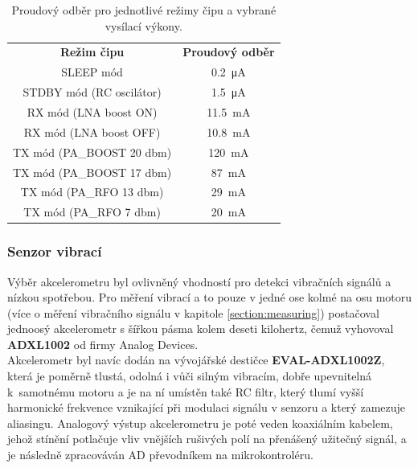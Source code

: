         \begin{table}[H]
        \begin{ctucolortab}
        \begin{tabular}{c!{\vrule width 2pt}c}
            \textbf{Režim čipu} &  \textbf{Proudový odběr}\\ 
            \Xhline{4\arrayrulewidth}
            SLEEP mód & \SI{0.2}{\micro\ampere} \\\hline
            STDBY mód (RC oscilátor)& \SI{1.5}{\micro\ampere} \\\hline
            RX mód (LNA boost ON) & \SI{11.5}{\milli\ampere} \\\hline
            RX mód (LNA boost OFF) & \SI{10.8}{\milli\ampere} \\\hline
            TX mód (PA\_BOOST 20 dbm) & \SI{120}{\milli\ampere} \\\hline
            TX mód (PA\_BOOST 17 dbm) & \SI{87}{\milli\ampere} \\\hline
            TX mód (PA\_RFO 13 dbm) & \SI{29}{\milli\ampere} \\\hline
            TX mód (PA\_RFO 7 dbm) & \SI{20}{\milli\ampere}
        \end{tabular}
        \end{ctucolortab}
        \caption{Proudový odběr pro jednotlivé režimy čipu a vybrané vysílací výkony.}
        \label{table:currents}
    \end{table}

    

\subsubsection{Senzor vibrací}
    Výběr akcelerometru byl ovlivněný vhodností pro detekci vibračních signálů a nízkou spotřebou. Pro měření vibrací a to pouze v jedné ose kolmé na osu motoru (více o měření vibračního signálu v kapitole \ref{section:measuring}) postačoval jednoosý akcelerometr s šířkou pásma kolem deseti kilohertz, čemuž vyhovoval \textbf{ADXL1002} od firmy Analog Devices.\\
    Akcelerometr byl navíc dodán na vývojářské destičce  \textbf{EVAL-ADXL1002Z}, která je poměrně tlustá, odolná i vůči silným vibracím, dobře upevnitelná k~samotnému motoru a je na ní umístěn také RC filtr, který tlumí vyšší harmonické frekvence vznikající při modulaci signálu v senzoru a který zamezuje aliasingu.
    Analogový výstup akcelerometru je poté veden koaxiálním kabelem, jehož stínění potlačuje vliv vnějších rušivých polí na přenášený užitečný signál, a je následně zpracováván AD převodníkem na mikrokontroléru.
    
